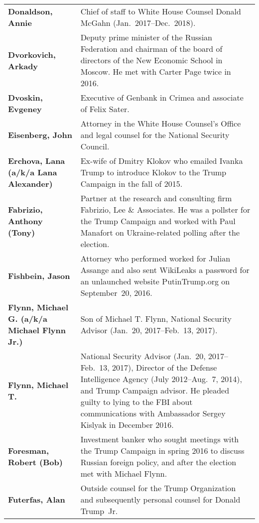 \begin{longtable}{ p{} p{} }
    \textbf{Donaldson, Annie} & Chief of staff to White House Counsel Donald McGahn (Jan.~2017--Dec.~2018). \\

    \textbf{Dvorkovich, Arkady} & Deputy prime minister of the Russian Federation and chairman of the board of directors of the New Economic School in Moscow. He met with Carter Page twice in 2016. \\

    \textbf{Dvoskin, Evgeney} & Executive of Genbank in Crimea and associate of Felix Sater. \\

    \textbf{Eisenberg, John} & Attorney in the White House Counsel's Office and legal counsel for the National Security Council. \\

    \textbf{Erchova, Lana (a/k/a Lana Alexander)} & Ex-wife of Dmitry Klokov who emailed Ivanka Trump to introduce Klokov to the Trump Campaign in the fall of 2015. \\

    \textbf{Fabrizio, Anthony (Tony)} & Partner at the research and consulting firm Fabrizio, Lee \& Associates. He was a pollster for the Trump Campaign and worked with Paul Manafort on Ukraine-related polling after the election. \\

    \textbf{Fishbein, Jason} & Attorney who performed worked for Julian Assange and also sent WikiLeaks a password for an unlaunched website PutinTrump.org on September~20, 2016. \\

    \textbf{Flynn, Michael G. (a/k/a Michael Flynn Jr.)} & Son of Michael T. Flynn, National Security Advisor (Jan.~20, 2017--Feb.~13, 2017). \\

    \textbf{Flynn, Michael T.} & National Security Advisor (Jan.~20, 2017--Feb.~13, 2017), Director of the Defense Intelligence Agency (July 2012--Aug.~7, 2014), and Trump Campaign advisor. He pleaded guilty to lying to the FBI about communications with Ambassador Sergey Kislyak in December 2016. \\

    \textbf{Foresman, Robert (Bob)} & Investment banker who sought meetings with the Trump Campaign in spring 2016 to discuss Russian foreign policy, and after the election met with Michael Flynn. \\

    \textbf{Futerfas, Alan} & Outside counsel for the Trump Organization and subsequently personal counsel for Donald Trump~Jr. \\


\end{longtable}
